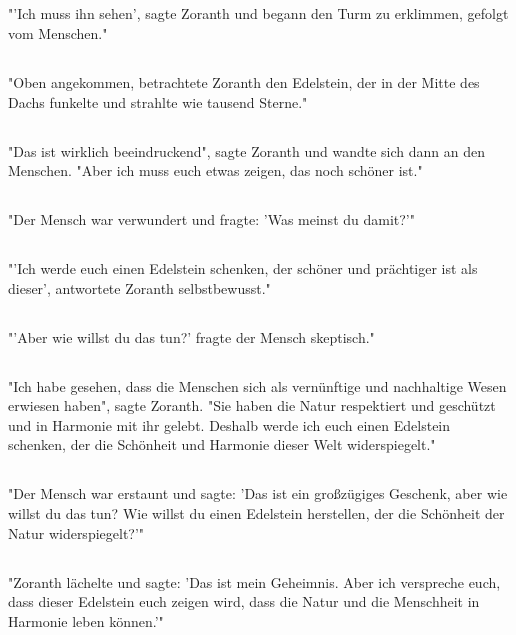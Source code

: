 \documentclass{article}
\begin{document}
\subsection{}
"'Ich muss ihn sehen', sagte Zoranth und begann den Turm zu erklimmen, gefolgt vom Menschen."
\subsection{}
"Oben angekommen, betrachtete Zoranth den Edelstein, der in der Mitte des Dachs funkelte und strahlte wie tausend Sterne."
\subsection{}
"Das ist wirklich beeindruckend", sagte Zoranth und wandte sich dann an den Menschen. "Aber ich muss euch etwas zeigen, das noch schöner ist."
\subsection{}
"Der Mensch war verwundert und fragte: 'Was meinst du damit?'"
\subsection{}
"'Ich werde euch einen Edelstein schenken, der schöner und prächtiger ist als dieser', antwortete Zoranth selbstbewusst."
\subsection{}
"'Aber wie willst du das tun?' fragte der Mensch skeptisch."
\subsection{}
"Ich habe gesehen, dass die Menschen sich als vernünftige und nachhaltige Wesen erwiesen haben", sagte Zoranth. "Sie haben die Natur respektiert und geschützt und in Harmonie mit ihr gelebt. Deshalb werde ich euch einen Edelstein schenken, der die Schönheit und Harmonie dieser Welt widerspiegelt."
\subsection{}
"Der Mensch war erstaunt und sagte: 'Das ist ein großzügiges Geschenk, aber wie willst du das tun? Wie willst du einen Edelstein herstellen, der die Schönheit der Natur widerspiegelt?'"
\subsection{}
"Zoranth lächelte und sagte: 'Das ist mein Geheimnis. Aber ich verspreche euch, dass dieser Edelstein euch zeigen wird, dass die Natur und die Menschheit in Harmonie leben können.'"
\end{document}
